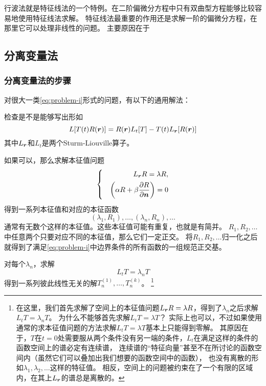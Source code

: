 \documentclass[UTF8]{ctexart}
\newenvironment{bigcase}{\left\{ \quad \begin{aligned}}{\end{aligned}\right.}
\renewenvironment{enumerate}{\begin{compactenum}}{\end{compactenum}}
\begin{document}
行波法就是特征线法的一个特例。在二阶偏微分方程中只有双曲型方程能够比较容易地使用特征线法求解。
特征线法最重要的作用还是求解一阶的偏微分方程，在那里它可以处理非线性的问题。
主要原因在于

\subsection{分离变量法}\label{sec:separation-of-variables}

\subsubsection{分离变量法的步骤}\label{sec:separation-of-variables-steps}

对很大一类\eqref{eq:problem-i}形式的问题，有以下的通用解法：
\begin{enumerate}
    \item 检查是不是能够写出形如
    \[
        L[T(t)R(\vb*{r})] = R(\vb*{r}) L_t [T] - T(t) L_{\vb*{r}} [R(\vb*{r})]
    \]
    其中$L_{\vb*{r}}$和$L_t$是两个Sturm-Liouville算子。
    \item 如果可以，那么求解本征值问题
    \[
        \begin{bigcase}
            L_{\vb*{r}} R = \lambda R, \\
            \left( \alpha R + \beta \pdv{R}{\vb*{n}} \right) = 0
        \end{bigcase}
    \]
    得到一系列本征值和对应的本征函数
    \[
        (\lambda_1, R_1), \ldots, (\lambda_n, R_n), \ldots
    \]
    通常有无数个这样的本征值。这些本征值可能有重复，也就是有简并。
    $R_1, R_2, \ldots$中任意两个只要对应不同的本征值，那么它们一定正交。
    将$R_1, R_2, \ldots$归一化之后就得到了满足\eqref{eq:problem-i}中边界条件的所有函数的一组规范正交基。
    \item 对每个$\lambda_n$，求解
    \[
        L_t T = \lambda_n T
    \]
    得到一系列彼此线性无关的解$T_n^{(1)}, \ldots, T_n^{(k)}$。%
    \footnote{在这里，我们首先求解了空间上的本征值问题$L_{\vb*{r}} R = \lambda R$，得到了$\lambda_n$之后求解$L_t T = \lambda_n T$。
    为什么不能够首先求解$L_t T = \lambda T$？
    实际上也可以，不过如果使用通常的求本征值问题的方法求解$L_t T = \lambda T$基本上只能得到零解。
    其原因在于，$T$在$t=0$处需要服从两个条件没有另一端的条件，$L_t$在满足这样的条件的函数空间上的谱必定有连续谱，
    连续谱的“特征向量”甚至不在所讨论的函数空间内（虽然它们可以叠加出我们想要的函数空间中的函数），
    也没有离散的形如$\lambda_1, \lambda_2, \ldots$这样的特征值。
    相反，空间上的问题被约束在了一个有限的区域内，在其上$L_{\vb*{r}}$的谱总是离散的。
}
\end{enumerate}
\end{document}
